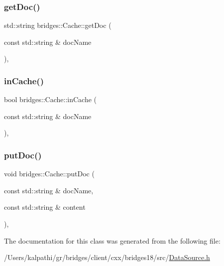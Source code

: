 \subsubsection{\texorpdfstring{get\+Doc()}{getDoc()}}
{\footnotesize\ttfamily std\+::string bridges\+::\+Cache\+::get\+Doc (\begin{DoxyParamCaption}\item[{const std\+::string \&}]{doc\+Name }\end{DoxyParamCaption})\hspace{0.3cm}{\ttfamily [inline]}, {\ttfamily [noexcept]}}

\mbox{\label{classbridges_1_1_cache_a47b9bd1b61a90f2844b4220337dd10fe}} 
\subsubsection{\texorpdfstring{in\+Cache()}{inCache()}}
{\footnotesize\ttfamily bool bridges\+::\+Cache\+::in\+Cache (\begin{DoxyParamCaption}\item[{const std\+::string \&}]{doc\+Name }\end{DoxyParamCaption})\hspace{0.3cm}{\ttfamily [inline]}, {\ttfamily [noexcept]}}

\mbox{\label{classbridges_1_1_cache_ac289170b26980f80e6789f40561b5a95}} 
\subsubsection{\texorpdfstring{put\+Doc()}{putDoc()}}
{\footnotesize\ttfamily void bridges\+::\+Cache\+::put\+Doc (\begin{DoxyParamCaption}\item[{const std\+::string \&}]{doc\+Name,  }\item[{const std\+::string \&}]{content }\end{DoxyParamCaption})\hspace{0.3cm}{\ttfamily [inline]}, {\ttfamily [noexcept]}}



The documentation for this class was generated from the following file\+:\begin{DoxyCompactItemize}
\item 
/\+Users/kalpathi/gr/bridges/client/cxx/bridges18/src/\mbox{\hyperlink{_data_source_8h}{Data\+Source.\+h}}\end{DoxyCompactItemize}
